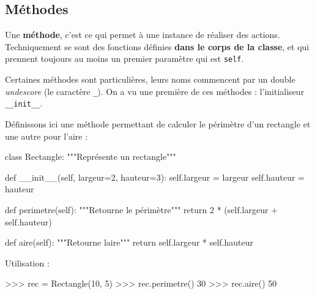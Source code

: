 \documentclass[
  a4paper,
  DIV=11,
  numbers=noendperiod]{scrartcl}
\newenvironment{Shaded}{\begin{snugshade}}{\end{snugshade}}
\newcommand{\CommentTok}[1]{\textcolor[rgb]{0.37,0.37,0.37}{#1}}
\newcommand{\ControlFlowTok}[1]{\textcolor[rgb]{0.00,0.23,0.31}{#1}}
\newcommand{\DecValTok}[1]{\textcolor[rgb]{0.68,0.00,0.00}{#1}}
\newcommand{\FunctionTok}[1]{\textcolor[rgb]{0.28,0.35,0.67}{#1}}
\newcommand{\KeywordTok}[1]{\textcolor[rgb]{0.00,0.23,0.31}{#1}}
\newcommand{\NormalTok}[1]{\textcolor[rgb]{0.00,0.23,0.31}{#1}}
\newcommand{\OperatorTok}[1]{\textcolor[rgb]{0.37,0.37,0.37}{#1}}
\newcommand{\VariableTok}[1]{\textcolor[rgb]{0.07,0.07,0.07}{#1}}
\begin{document}
\hypertarget{muxe9thodes}{%
\subsection{Méthodes}\label{muxe9thodes}}

Une \textbf{méthode}, c'est ce qui permet à une instance de réaliser des
actions. Techniquement se sont des fonctions définies \textbf{dans le
corps de la classe}, et qui prennent toujours au moins un premier
paramètre qui est \texttt{self}.

Certaines méthodes sont particulières, leurs noms commencent par un
double \emph{undescore} (le caractère \texttt{\_}). On a vu une première
de ces méthodes : l'initialiseur \texttt{\_\_init\_\_}.

Définissons ici une méthode permettant de calculer le périmètre d'un
rectangle et une autre pour l'aire :

\begin{Shaded}
\begin{Highlighting}[]
\KeywordTok{class}\NormalTok{ Rectangle:}
    \CommentTok{"""Représente un rectangle"""}

    \KeywordTok{def} \FunctionTok{\_\_init\_\_}\NormalTok{(}\VariableTok{self}\NormalTok{, largeur}\OperatorTok{=}\DecValTok{2}\NormalTok{, hauteur}\OperatorTok{=}\DecValTok{3}\NormalTok{):}
        \VariableTok{self}\NormalTok{.largeur }\OperatorTok{=}\NormalTok{ largeur}
        \VariableTok{self}\NormalTok{.hauteur }\OperatorTok{=}\NormalTok{ hauteur}

    \KeywordTok{def}\NormalTok{ perimetre(}\VariableTok{self}\NormalTok{):}
        \CommentTok{"""Retourne le périmètre"""}
        \ControlFlowTok{return} \DecValTok{2} \OperatorTok{*}\NormalTok{ (}\VariableTok{self}\NormalTok{.largeur }\OperatorTok{+} \VariableTok{self}\NormalTok{.hauteur)}

    \KeywordTok{def}\NormalTok{ aire(}\VariableTok{self}\NormalTok{):}
        \CommentTok{"""Retourne l\textquotesingle{}aire"""}
        \ControlFlowTok{return} \VariableTok{self}\NormalTok{.largeur }\OperatorTok{*} \VariableTok{self}\NormalTok{.hauteur}
\end{Highlighting}
\end{Shaded}

Utilisation :

\begin{Shaded}
\begin{Highlighting}[]
\OperatorTok{\textgreater{}\textgreater{}\textgreater{}}\NormalTok{ rec }\OperatorTok{=}\NormalTok{ Rectangle(}\DecValTok{10}\NormalTok{, }\DecValTok{5}\NormalTok{)}
\OperatorTok{\textgreater{}\textgreater{}\textgreater{}}\NormalTok{ rec.perimetre()}
\DecValTok{30}
\OperatorTok{\textgreater{}\textgreater{}\textgreater{}}\NormalTok{ rec.aire()}
\DecValTok{50}
\end{Highlighting}
\end{Shaded}
\end{document}
